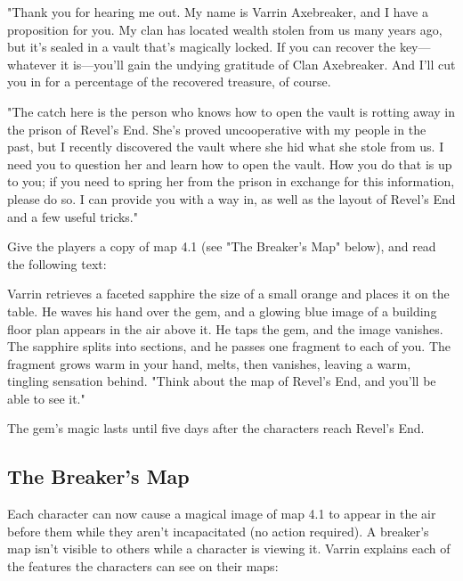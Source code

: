 \documentclass[10pt,a4paper,twoside,bg=print,twocolumn,openany,nodeprecatedcode]{dndbook}
\begin{document}
\begin{DndReadAloud}{}
"Thank you for hearing me out. My name is Varrin Axebreaker, and I have a proposition for you. My clan has located wealth stolen from us many years ago, but it's sealed in a vault that's magically locked. If you can recover the key—whatever it is—you'll gain the undying gratitude of Clan Axebreaker. And I'll cut you in for a percentage of the recovered treasure, of course.

"The catch here is the person who knows how to open the vault is rotting away in the prison of Revel's End. She's proved uncooperative with my people in the past, but I recently discovered the vault where she hid what she stole from us. I need you to question her and learn how to open the vault. How you do that is up to you; if you need to spring her from the prison in exchange for this information, please do so. I can provide you with a way in, as well as the layout of Revel's End and a few useful tricks."

\end{DndReadAloud}

Give the players a copy of map 4.1 (see "The Breaker's Map" below), and read the following text:

\begin{DndReadAloud}{}
Varrin retrieves a faceted sapphire the size of a small orange and places it on the table. He waves his hand over the gem, and a glowing blue image of a building floor plan appears in the air above it. He taps the gem, and the image vanishes. The sapphire splits into sections, and he passes one fragment to each of you. The fragment grows warm in your hand, melts, then vanishes, leaving a warm, tingling sensation behind. "Think about the map of Revel's End, and you'll be able to see it."

\end{DndReadAloud}

The gem's magic lasts until five days after the characters reach Revel's End.

\subsection{The Breaker's Map}
Each character can now cause a magical image of map 4.1 to appear in the air before them while they aren't incapacitated (no action required). A breaker's map isn't visible to others while a character is viewing it. Varrin explains each of the features the characters can see on their maps:
\end{document}
